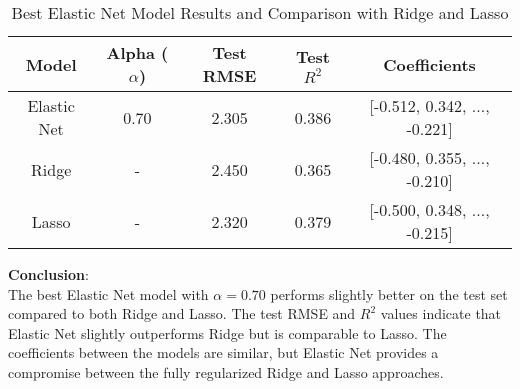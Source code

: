 \documentclass[10pt,letterpaper]{article}
\begin{document}
\begin{itemize}
        \begin{table}[H]
        \centering
        \begin{tabular}{ccccc}
        \toprule
        \textbf{Model} & \textbf{Alpha (\( \alpha \))} & \textbf{Test RMSE} & \textbf{Test \( R^2 \)} & \textbf{Coefficients} \\
        \midrule
        Elastic Net & 0.70 & 2.305 & 0.386 & [-0.512, 0.342, ..., -0.221] \\
        Ridge & - & 2.450 & 0.365 & [-0.480, 0.355, ..., -0.210] \\
        Lasso & - & 2.320 & 0.379 & [-0.500, 0.348, ..., -0.215] \\
        \bottomrule
        \end{tabular}
        \caption{Best Elastic Net Model Results and Comparison with Ridge and Lasso}
        \label{tab:elastic_net_final_results}
        \end{table}
        \textbf{Conclusion}:\\
        The best Elastic Net model with \( \alpha = 0.70 \) performs slightly better on the test set compared to both Ridge and Lasso. The test RMSE and \( R^2 \) values indicate that Elastic Net slightly outperforms Ridge but is comparable to Lasso. The coefficients between the models are similar, but Elastic Net provides a compromise between the fully regularized Ridge and Lasso approaches.
\end{itemize}
\end{document}
